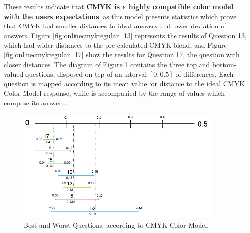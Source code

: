 %
These results indicate that \textbf{CMYK is a highly compatible color model with the users expectations}, as this model presents statistics which prove that CMYK had smaller distances to ideal answers and lower deviation of answers.
Figure \ref{fig:onlinecmykregular_13} represents the results of Question 13, which had wider distances to the pre-calculated CMYK blend, and Figure \ref{fig:onlinecmykregular_17} show the results for Question 17, the question with closer
distances. The diagram of Figure \ref{fig:cmyk_analysis} contains the three top and bottom-valued questions, disposed on top of an interval $[0 ; 0.5]$ of differences. Each question is mapped according to its mean value for
distance to the ideal CMYK Color Model response, while is accompanied by the range of values which compose its answers. \par
%
\begin{figure}[!htbp]
  \centering
  \includegraphics[width=0.9\textwidth]{images/results/cmyk_questions_analysis.png}
  \caption[Best and Worst Questions, according to CMYK Color Model.]{Best and Worst Questions, according to CMYK Color Model.}
  \label{fig:cmyk_analysis}
\end{figure}
%
%
